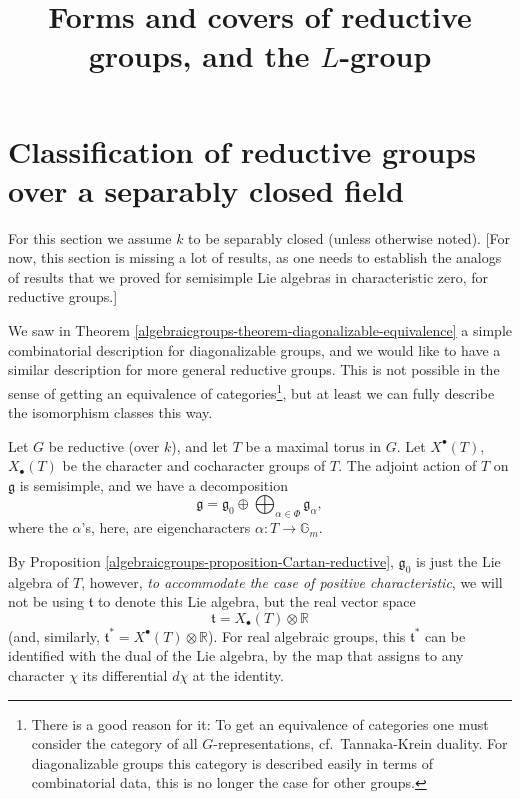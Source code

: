 

%


\title{Forms and covers of reductive groups, and the $L$-group}


\maketitle

\label{section-phantom}

\tableofcontents



\section{Classification of reductive groups over a separably closed field}
\label{section-classification-reductive}


For this section we assume $k$ to be separably closed (unless otherwise noted). [For now, this section is missing a lot of results, as one needs to establish the analogs of results that we proved for semisimple Lie algebras in characteristic zero, for reductive groups.]

We saw in Theorem \ref{algebraicgroups-theorem-diagonalizable-equivalence} a simple combinatorial description for diagonalizable groups, and we would like to have a similar description for more general reductive groups. This is not possible in the sense of getting an equivalence of categories\footnote{There is a good reason for it: To get an equivalence of categories one must consider the category of all $G$-representations, cf.\ Tannaka-Krein duality. For diagonalizable groups this category is described easily in terms of combinatorial data, this is no longer the case for other groups.}, but at least we can fully describe the isomorphism classes this way.


Let $G$ be reductive (over $k$), and let $T$ be a maximal torus in $G$. Let $X^\bullet(T)$, $X_\bullet(T)$ be the character and cocharacter groups of $T$. The adjoint action of $T$ on $\mathfrak g$ is semisimple, and we have a decomposition 
$$\mathfrak g = \mathfrak g_0 \oplus \bigoplus_{\alpha\in\Phi} \mathfrak g_\alpha,$$
where the $\alpha$'s, here, are eigencharacters $\alpha: T\to \mathbb G_m$. 

By Proposition \ref{algebraicgroups-proposition-Cartan-reductive}, $\mathfrak g_0$ is just the Lie algebra of $T$, however, \emph{to accommodate the case of positive characteristic}, we will not be using $\mathfrak t$ to denote this Lie algebra, but the real vector space
$$ \mathfrak t = X_\bullet(T)\otimes \mathbb R$$
(and, similarly, $\mathfrak t^*= X^\bullet(T)\otimes \mathbb R$). For real algebraic groups, this $\mathfrak t^*$ can be identified with the dual of the Lie algebra,  by the map that assigns to any character $\chi$ its differential $d\chi$ at the identity. 

